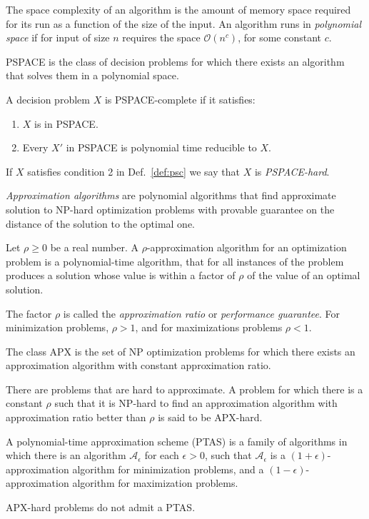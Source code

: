 The space complexity of an algorithm is the amount of memory space required for its run as a function of the size of the input.
An algorithm runs in \emph{polynomial space} if for input of size $n$ requires the space $\mathcal{O}(n^c)$, for some constant $c$.
\begin{definition}
	PSPACE is the class of decision problems for which there exists an algorithm that solves them in a polynomial space.
\end{definition}
\begin{definition}\label{def:psc}
	A decision problem $X$ is PSPACE-complete if it satisfies:
	\begin{enumerate}
		\item $X$ is in PSPACE.
		\item Every $X'$ in PSPACE is polynomial time reducible to $X$.
	\end{enumerate}
\end{definition}
If $X$ satisfies condition 2 in Def.~\ref{def:psc} we say that $X$ is \emph{PSPACE-hard}.

\emph{Approximation algorithms} are polynomial algorithms that find approximate solution to NP-hard optimization problems with provable guarantee on the distance of the solution to the optimal one.
\begin{definition}\cite{williamson11}
Let $\rho\geq0$ be a real number.
A $\rho$-approximation algorithm for an optimization problem is a polynomial-time algorithm, that for all instances of the problem produces a solution whose value is within a factor of
$\rho$ of the value of an optimal solution.
\end{definition}
The factor $\rho$ is called the \emph{approximation ratio} or \emph{performance guarantee}.
For minimization problems, $\rho > 1$, and for maximizations problems $\rho < 1$.
\begin{definition}
The class APX is the set of NP optimization problems for which there exists an approximation algorithm with constant approximation ratio.
\end{definition}
There are problems that are hard to approximate. 
A problem for which there is a constant $\rho$ such that it is NP-hard to find an approximation algorithm with approximation ratio better than $\rho$ is said to be APX-hard.
\begin{definition}\cite{williamson11}
A polynomial-time approximation scheme (PTAS) is a family of algorithms in which there is an algorithm $\mathcal{A}_\epsilon$ for each $\epsilon > 0$, such that $\mathcal{A}_\epsilon$
is a $(1+\epsilon)$-approximation algorithm for minimization problems, and a $(1-\epsilon)$-approximation algorithm for maximization problems.
\end{definition}
\begin{proposition}
APX-hard problems do not admit a PTAS.
\end{proposition}

